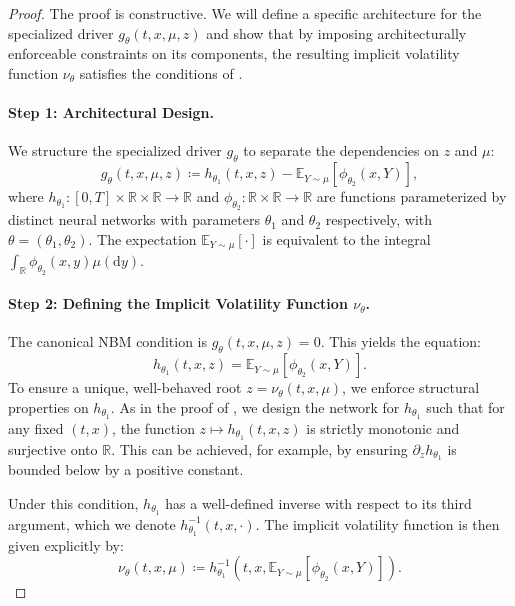 \documentclass[10pt,a4paper]{amsart}
\newcommand{\R}{\mathbb{R}}
\newcommand{\dd}{\mathrm{d}}
\begin{document}
\begin{proof}
The proof is constructive. We will define a specific architecture for the specialized driver $g_\theta(t,x,\mu,z)$ and show that by imposing architecturally enforceable constraints on its components, the resulting implicit volatility function $\nu_\theta$ satisfies the conditions of .

\paragraph{Step 1: Architectural Design.}
We structure the specialized driver $g_\theta$ to separate the dependencies on $z$ and $\mu$:
\begin{equation}
\label{eq:mckean_driver_arch}
    g_\theta(t, x, \mu, z) \coloneqq h_{\theta_1}(t, x, z) - \mathbb{E}_{Y \sim \mu}[\phi_{\theta_2}(x, Y)],
\end{equation}
where $h_{\theta_1}: [0,T] \times \R \times \R \to \R$ and $\phi_{\theta_2}: \R \times \R \to \R$ are functions parameterized by distinct neural networks with parameters $\theta_1$ and $\theta_2$ respectively, with $\theta = (\theta_1, \theta_2)$. The expectation $\mathbb{E}_{Y \sim \mu}[\cdot]$ is equivalent to the integral $\int_\R \phi_{\theta_2}(x, y)\mu(\dd y)$.

\paragraph{Step 2: Defining the Implicit Volatility Function $\nu_\theta$.}
The canonical NBM condition is $g_\theta(t, x, \mu, z) = 0$. This yields the equation:
\[ h_{\theta_1}(t, x, z) = \mathbb{E}_{Y \sim \mu}[\phi_{\theta_2}(x, Y)]. \]
To ensure a unique, well-behaved root $z = \nu_\theta(t,x,\mu)$, we enforce structural properties on $h_{\theta_1}$. As in the proof of , we design the network for $h_{\theta_1}$ such that for any fixed $(t,x)$, the function $z \mapsto h_{\theta_1}(t,x,z)$ is strictly monotonic and surjective onto $\R$. This can be achieved, for example, by ensuring $\partial_z h_{\theta_1}$ is bounded below by a positive constant.

Under this condition, $h_{\theta_1}$ has a well-defined inverse with respect to its third argument, which we denote $h_{\theta_1}^{-1}(t,x,\cdot)$. The implicit volatility function is then given explicitly by:
\begin{equation}
\label{eq:nu_theta_explicit}
    \nu_\theta(t, x, \mu) \coloneqq h_{\theta_1}^{-1}\left(t, x, \mathbb{E}_{Y \sim \mu}[\phi_{\theta_2}(x, Y)]\right).
\end{equation}


\end{proof}
\end{document}
